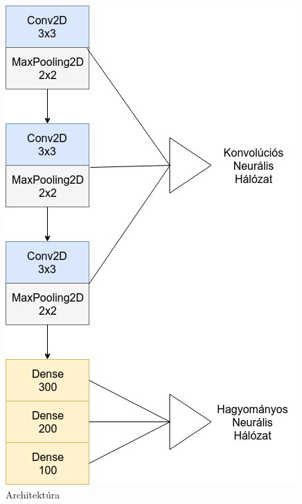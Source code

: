 \begin{figure}[h]
\centering
\includegraphics[scale=0.35]{images/cnn_architecture}
\caption{Architektúra}
\label{fig:cnn_arch}
\end{figure}


